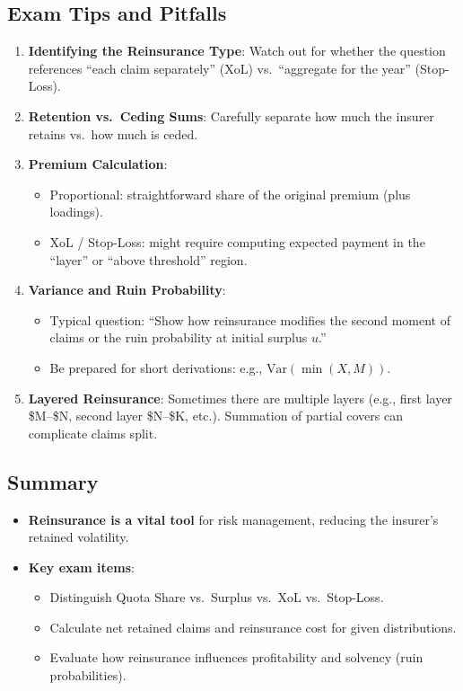 \documentclass[13pt,a4paper]{article}
\begin{document}
\subsection{Exam Tips and Pitfalls}
\begin{enumerate}
  \item \textbf{Identifying the Reinsurance Type}: Watch out for whether the question references “each claim separately” (XoL) vs.\ “aggregate for the year” (Stop-Loss).
  \item \textbf{Retention vs.\ Ceding Sums}: Carefully separate how much the insurer retains vs.\ how much is ceded. 
  \item \textbf{Premium Calculation}: 
    \begin{itemize}
      \item Proportional: straightforward share of the original premium (plus loadings).
      \item XoL / Stop-Loss: might require computing expected payment in the “layer” or “above threshold” region.
    \end{itemize}
  \item \textbf{Variance and Ruin Probability}: 
    \begin{itemize}
      \item Typical question: “Show how reinsurance modifies the second moment of claims or the ruin probability at initial surplus \(u\).”
      \item Be prepared for short derivations: e.g., \(\mathrm{Var}(\min(X,M))\).
    \end{itemize}
  \item \textbf{Layered Reinsurance}: Sometimes there are multiple layers (e.g., first layer \$M–\$N, second layer \$N–\$K, etc.). Summation of partial covers can complicate claims split.
\end{enumerate}

\subsection{Summary}
\begin{itemize}
  \item \textbf{Reinsurance is a vital tool} for risk management, reducing the insurer’s retained volatility.
  \item \textbf{Key exam items}: 
    \begin{itemize}
      \item Distinguish Quota Share vs.\ Surplus vs.\ XoL vs.\ Stop-Loss.
      \item Calculate net retained claims and reinsurance cost for given distributions.
      \item Evaluate how reinsurance influences profitability and solvency (ruin probabilities).
    \end{itemize}
\end{itemize}
\end{document}
